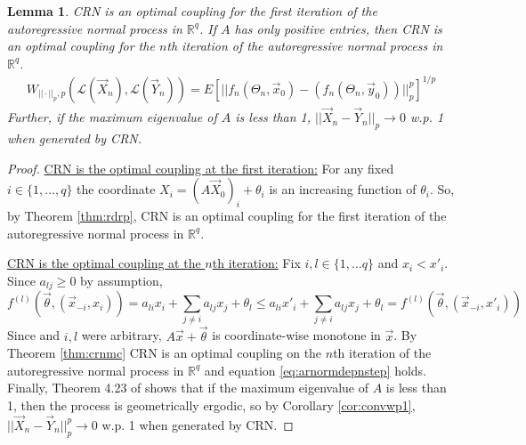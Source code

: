 \documentclass[12pt]{article}
\theoremstyle{plain}%
\newtheorem{lemma}[theorem]{Lemma}
\theoremstyle{definition}
\def\vecx{\vec{X}}
\begin{document}
	\begin{lemma}\label{lem:arnormdepnstep}
		 CRN is an optimal coupling for the first iteration of the autoregressive normal process in $\mathbb{R}^q$.
		 If $A$ has only positive entries, then CRN is an optimal coupling for the $n$th iteration of the autoregressive normal process in $\mathbb{R}^q$. 
		\begin{align}\label{eq:arnormdepnstep}
			W_{||\cdot||_p,p}(\mathcal{L}(\vecx_n), \mathcal{L}(\vec{Y}_{n}))=
			E[||f_n(\Theta_n,\vec{x}_{0})-(f_n(\Theta_n,\vec{y}_{0}))||_p^p]^{1/p}
		\end{align}
		Further, if the maximum eigenvalue of $A$ is less than 1, $||\vec{X}_n-\vec{Y}_{n}||_p\to 0$ w.p. 1 when generated by CRN.
	\end{lemma}
	\begin{proof}
		
		\underline{CRN is the optimal coupling at the first iteration:} For any fixed $i\in\{1,\ldots,q\}$ the coordinate $X_{i}=(A\vec{X}_{0})_{i}+\theta_{i}$ is an increasing function of $\theta_{i}$. So, by Theorem \ref{thm:rdrp}, CRN is an optimal coupling for the first iteration of the autoregressive normal process in $\mathbb{R}^q$.
		
	\underline{CRN is the optimal coupling at the $n$th iteration:}
		Fix $i,l\in \{1,\ldots q\}$ and $x_i<x'_i$. Since $a_{lj}\geq 0$ by assumption, $$f^{(l)}(\vec{\theta},(\vec{x}_{-i},x_i))= a_{li}x_i +\sum_{j\neq i}a_{lj}x_j +\theta_l\leq a_{li}x'_i +\sum_{j\neq i}a_{lj}x_j +\theta_l= f^{(l)}(\vec{\theta},(\vec{x}_{-i},x'_i))$$ Since and $i,l$ were arbitrary, $A\vec{x}+\vec{\theta}$ is coordinate-wise monotone in $\vec{x}$. 
		By Theorem \ref{thm:crnmc} CRN is an optimal coupling on the $n$th iteration of the autoregressive normal process in $\mathbb{R}^q$ and equation \ref{eq:arnormdepnstep} holds.  
		Finally, Theorem 4.23 of \cite{sixta} shows that if the maximum eigenvalue of $A$ is less than 1, then the process is geometrically ergodic, so by Corollary \ref{cor:convwp1}, $||\vec{X}_n- \vec{Y}_{n}||_p^p\to 0$ w.p. 1 when generated by CRN.
	\end{proof}
\end{document}

